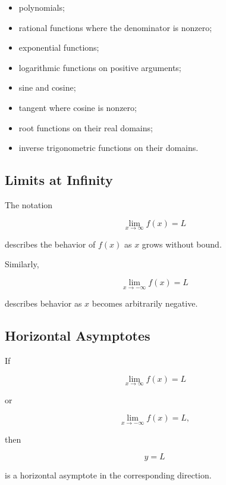 \begin{itemize}
    \item polynomials;
    \item rational functions where the denominator is nonzero;
    \item exponential functions;
    \item logarithmic functions on positive arguments;
    \item sine and cosine;
    \item tangent where cosine is nonzero;
    \item root functions on their real domains;
    \item inverse trigonometric functions on their domains.
\end{itemize}

\subsection{Limits at Infinity}
\label{subsec:limits-at-infinity-reference}

The notation

\[
\boxed{
\lim_{x\to\infty}f(x)=L
}
\]

describes the behavior of \(f(x)\) as \(x\) grows without bound.

Similarly,

\[
\boxed{
\lim_{x\to-\infty}f(x)=L
}
\]

describes behavior as \(x\) becomes arbitrarily negative.

\subsection{Horizontal Asymptotes}
\label{subsec:horizontal-asymptote-limit}

If

\[
\boxed{
\lim_{x\to\infty}f(x)=L
}
\]

or

\[
\boxed{
\lim_{x\to-\infty}f(x)=L,
}
\]

then

\[
\boxed{
y=L
}
\]

is a horizontal asymptote in the corresponding direction.

